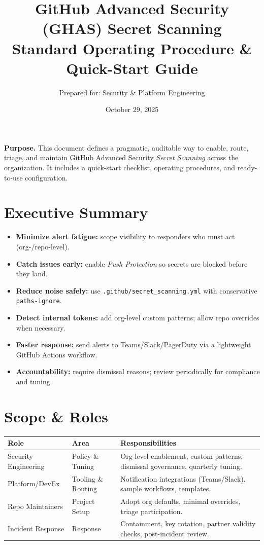 \documentclass[11pt,a4paper]{article}
\title{\textbf{GitHub Advanced Security (GHAS) Secret Scanning}\\
  \large Standard Operating Procedure \& Quick-Start Guide}
\author{Prepared for: Security \& Platform Engineering}
\date{October 29, 2025}
\begin{document}
\maketitle

\begin{tcolorbox}
\textbf{Purpose.} This document defines a pragmatic, auditable way to enable, route, triage, and maintain
GitHub Advanced Security \emph{Secret Scanning} across the organization. It includes
a quick-start checklist, operating procedures, and ready-to-use configuration.
\end{tcolorbox}

\section*{Executive Summary}
\begin{itemize}
  \item \textbf{Minimize alert fatigue:} scope visibility to responders who must act (org-/repo-level).
  \item \textbf{Catch issues early:} enable \emph{Push Protection} so secrets are blocked before they land.
  \item \textbf{Reduce noise safely:} use \texttt{.github/secret\_scanning.yml} with conservative \texttt{paths-ignore}.
  \item \textbf{Detect internal tokens:} add org-level custom patterns; allow repo overrides when necessary.
  \item \textbf{Faster response:} send alerts to Teams/Slack/PagerDuty via a lightweight GitHub Actions workflow.
  \item \textbf{Accountability:} require dismissal reasons; review periodically for compliance and tuning.
\end{itemize}

\section{Scope \& Roles}
\begin{table}[h]
\centering
\begin{tabular}{@{}llp{8cm}@{}}
\toprule
\textbf{Role} & \textbf{Area} & \textbf{Responsibilities} \\
\midrule
Security Engineering & Policy \& Tuning & Org-level enablement, custom patterns, dismissal governance, quarterly tuning. \\
Platform/DevEx & Tooling \& Routing & Notification integrations (Teams/Slack), sample workflows, templates. \\
Repo Maintainers & Project Setup & Adopt org defaults, minimal overrides, triage participation. \\
Incident Response & Response & Containment, key rotation, partner validity checks, post-incident review. \\
\bottomrule
\end{tabular}
\end{table}
\end{document}
